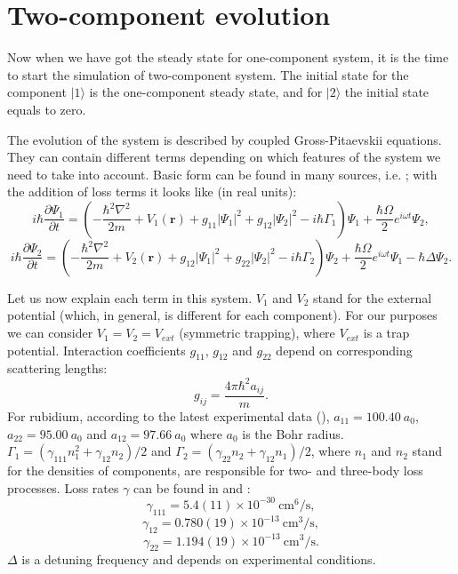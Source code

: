 \documentclass[12pt,notitlepage]{report}
\begin{document}
\section*{Two-component evolution}

Now when we have got the steady state for one-component system, it is the time to start the simulation of two-component system. The initial state for the component $\vert1\rangle$ is the one-component steady state, and for $\vert2\rangle$ the initial state equals to zero.

The evolution of the system is described by coupled Gross-Pitaevskii equations. They can contain different terms depending on which features of the system we need to take into account. Basic form can be found in many sources, i.e. \cite{pitaevskii_bec}; with the addition of loss terms it looks like (in real units):
\[ i \hbar \frac{\partial \Psi_1}{\partial t} = \left(
	-\frac{\hbar^2\nabla^2}{2m} + V_1(\mathbf{r}) +
	g_{11} \vert \Psi_1 \vert^2 + g_{12} \vert \Psi_2 \vert^2 - i \hbar \Gamma_1
\right) \Psi_1 + \frac{\hbar \Omega}{2}e^{i \omega t} \Psi_2, \]
\[ i \hbar \frac{\partial \Psi_2}{\partial t} = \left(
	-\frac{\hbar^2\nabla^2}{2m} + V_2(\mathbf{r}) +
	g_{12} \vert \Psi_1 \vert^2 + g_{22} \vert \Psi_2 \vert^2 - i \hbar \Gamma_2
\right) \Psi_2 + \frac{\hbar \Omega}{2}e^{i \omega t} \Psi_1 - \hbar \Delta \Psi_2. \]

Let us now explain each term in this system. $V_1$ and $V_2$ stand for the external potential (which, in general, is different for each component). For our purposes we can consider $V_1 = V_2 = V_{ext}$ (symmetric trapping), where $V_{ext}$ is a trap potential. Interaction coefficients $g_{11}$, $g_{12}$ and $g_{22}$ depend on corresponding scattering lengths:
\[ g_{ij} = \frac{4 \pi \hbar^2 a_{ij}}{m}. \]
For rubidium, according to the latest experimental data (\cite{PhysRevLett.99.190402}), $a_{11} = 100.40\ a_0$, $a_{22} = 95.00\ a_0$ and $a_{12} = 97.66\ a_0$ where $a_0$ is the Bohr radius. $\Gamma_1 = (\gamma_{111} n_1^2 + \gamma_{12} n_2) / 2$ and $\Gamma_2 = (\gamma_{22} n_2 + \gamma_{12} n_1) / 2$, where $n_1$ and $n_2$ stand for the densities of components, are responsible for two- and three-body loss processes. Loss rates $\gamma$ can be found in \cite{PhysRevLett.99.190402} and \cite{PhysRevLett.79.337}:
\[ \gamma_{111} = 5.4(11) \times 10^{-30}\ \textrm{cm}^6/\textrm{s}, \]
\[ \gamma_{12} = 0.780(19) \times 10^{-13}\ \textrm{cm}^3/\textrm{s}, \]
\[ \gamma_{22} = 1.194(19) \times 10^{-13}\ \textrm{cm}^3/\textrm{s}. \]
$\Delta$ is a detuning frequency and depends on experimental conditions.
\end{document}
